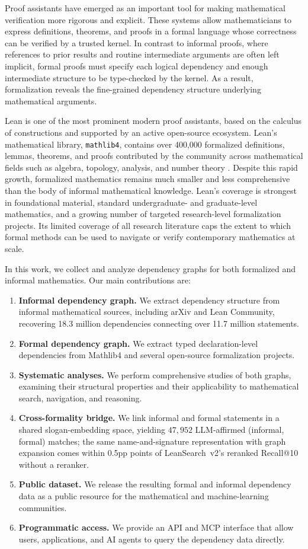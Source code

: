 Proof assistants have emerged as an important tool for making mathematical verification more rigorous and explicit. These systems allow mathematicians to express definitions, theorems, and proofs in a formal language whose correctness can be verified by a trusted kernel. In contrast to informal proofs, where references to prior results and routine intermediate arguments are often left implicit, formal proofs must specify each logical dependency and enough intermediate structure to be type-checked by the kernel. As a result, formalization reveals the fine-grained dependency structure underlying mathematical arguments. 

Lean is one of the most prominent modern proof assistants, based on the calculus of constructions and supported by an active open-source ecosystem. Lean's mathematical library, \verb|mathlib4|, contains over 400,000 formalized definitions, lemmas, theorems, and proofs contributed by the community across mathematical fields such as algebra, topology, analysis, and number theory \cite{lean4export}. Despite this rapid growth, formalized mathematics remains much smaller and less comprehensive than the body of informal mathematical knowledge. Lean’s coverage is strongest in foundational material, standard undergraduate- and graduate-level mathematics, and a growing number of targeted research-level formalization projects. Its limited coverage of all research literature caps the extent to which formal methods can be used to navigate or verify contemporary mathematics at scale.

In this work, we collect and analyze dependency graphs for both formalized and informal mathematics. Our main contributions are: 
\begin{enumerate}
    \item \textbf{Informal dependency graph.} We extract dependency structure from informal mathematical sources, including arXiv and Lean Community, recovering 18.3 million dependencies connecting over 11.7 million statements.
    \item \textbf{Formal dependency graph.} We extract typed declaration-level dependencies from Mathlib4 and several open-source formalization projects.
    \item \textbf{Systematic analyses.} We perform comprehensive studies of both graphs, examining their structural properties and their applicability to mathematical search, navigation, and reasoning.
    \item \textbf{Cross-formality bridge.} We link informal and formal statements in a shared slogan-embedding space, yielding $47{,}952$ LLM-affirmed (informal, formal) matches; the same name-and-signature representation with graph expansion comes within 0.5pp points of LeanSearch~v2's reranked Recall@10 without a reranker.
    \item \textbf{Public dataset.} We release the resulting formal and informal dependency data as a public resource for the mathematical and machine-learning communities.
    \item \textbf{Programmatic access.} We provide an API and MCP interface that allow users, applications, and AI agents to query the dependency data directly.
\end{enumerate}